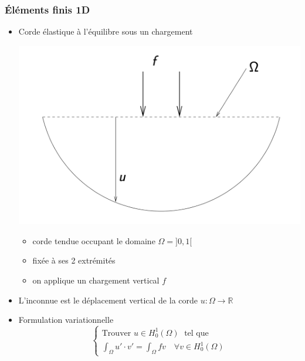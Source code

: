 \documentclass{beamer}
\begin{document}
\begin{frame}
\frametitle{Éléments finis 1D}

\begin{itemize}
\item Corde élastique à l'équilibre sous un chargement
\begin{center}
\includegraphics[scale=0.2]{corde00.png} 
\end{center}
\begin{itemize}
\item corde tendue occupant le domaine $\Omega= ]0, 1[$
\item fixée à ses 2 extrémités
\item on applique un chargement vertical $f$
\end{itemize}

\item L'inconnue est le déplacement vertical de la corde $u : \Omega \to \mathbb{R}$
\item Formulation variationnelle
\begin{equation}
\left\{
\begin{array}{l}
\mbox{Trouver } u \in H_0^1(\Omega)\;\mbox{ tel que }\\
\displaystyle \int_{\Omega} u'\cdot  v' = \int_{\Omega}f v \quad \forall v\in H_0^1(\Omega) 
\end{array}
\right.
\label{formVar1}
\end{equation}
\end{itemize}
\end{frame}
\end{document}
